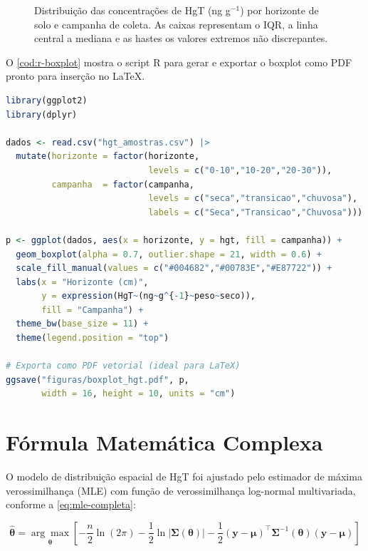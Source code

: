 \begin{figure}[htb]
  \centering
  \fbox{\rule{0pt}{6cm}\rule{\textwidth}{0pt}}
  \caption{Distribuição das concentrações de HgT (ng g$^{-1}$)
           por horizonte de solo e campanha de coleta.
           As caixas representam o IQR, a linha central a mediana
           e as hastes os valores extremos não discrepantes.}
  \label{fig:boxplot}
\end{figure}

O \autoref{cod:r-boxplot} mostra o script R para gerar e exportar
o boxplot como PDF pronto para inserção no LaTeX.

\begin{lstlisting}[language=R,
  caption={Script R para gerar boxplot e exportar como PDF.},
  label=cod:r-boxplot]
library(ggplot2)
library(dplyr)

dados <- read.csv("hgt_amostras.csv") |>
  mutate(horizonte = factor(horizonte,
                            levels = c("0-10","10-20","20-30")),
         campanha  = factor(campanha,
                            levels = c("seca","transicao","chuvosa"),
                            labels = c("Seca","Transicao","Chuvosa")))

p <- ggplot(dados, aes(x = horizonte, y = hgt, fill = campanha)) +
  geom_boxplot(alpha = 0.7, outlier.shape = 21, width = 0.6) +
  scale_fill_manual(values = c("#004682","#00783E","#E87722")) +
  labs(x = "Horizonte (cm)",
       y = expression(HgT~(ng~g^{-1}~peso~seco)),
       fill = "Campanha") +
  theme_bw(base_size = 11) +
  theme(legend.position = "top")

# Exporta como PDF vetorial (ideal para LaTeX)
ggsave("figuras/boxplot_hgt.pdf", p,
       width = 16, height = 10, units = "cm")
\end{lstlisting}

\section{Fórmula Matemática Complexa}

O modelo de distribuição espacial de HgT foi ajustado pelo
estimador de máxima verossimilhança (MLE) com função de
verossimilhança log-normal multivariada, conforme a
\autoref{eq:mle-completa}:

\begin{equation}
  \label{eq:mle-completa}
  \hat{\boldsymbol{\theta}} =
    \underset{\boldsymbol{\theta}}{\arg\max}
    \left[
      -\frac{n}{2}\ln(2\pi)
      -\frac{1}{2}\ln\left|\boldsymbol{\Sigma}(\boldsymbol{\theta})\right|
      -\frac{1}{2}
        \left(\mathbf{y} - \boldsymbol{\mu}\right)^{\!\top}
        \boldsymbol{\Sigma}^{-1}(\boldsymbol{\theta})
        \left(\mathbf{y} - \boldsymbol{\mu}\right)
    \right]
\end{equation}

